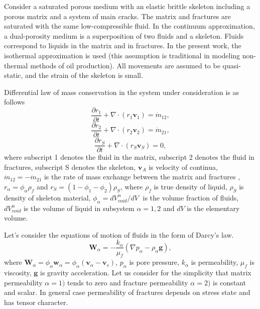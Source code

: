 \documentclass[article,authoryear,jpm]{beg_39}             %
\begin{document}
Consider a saturated porous medium with an elastic brittle skeleton including a porous matrix and a system of main cracks.
The matrix and fractures are saturated with the same low-compressible fluid.
In the continuum approximation, a dual-porosity medium is a superposition of two fluids and a skeleton.
Fluids correspond to liquids in the matrix and in fractures.
In the present work, the isothermal approximation is used (this assumption is traditional in modeling non-thermal methods of oil production).
All movements are assumed to be quasi-static, and the strain of the skeleton is small.

Differential law of mass conservation in the system under consideration is as follows
\begin{equation}
\frac{\partial {{r}_{1}}}{\partial t}+\nabla \cdot \left( {{r}_{1}}{{\mathbf{v}}_{1}} \right)={{\dot{m}}_{12}},
\end{equation}
\begin{equation}
\frac{\partial {{r}_{2}}}{\partial t}+\nabla \cdot \left( {{r}_{2}}{{\mathbf{v}}_{2}} \right)={{\dot{m}}_{21}},
\end{equation}
\begin{equation}
\frac{\partial {{r}_{S}}}{\partial t}+\nabla \cdot \left( {{r}_{S}}{{\mathbf{v}}_{S}} \right)=0,
\end{equation}
where subscript 1 denotes the fluid in the matrix, subscript 2 denotes the fluid in fractures, subscript S denotes the skeleton, ${{\mathbf{v}}_{A}}$ is velocity of continua, ${{\dot{m}}_{12}}=-{{\dot{m}}_{21}}$ is the rate of mass exchange between the matrix and fractures , ${{r}_{\alpha }}={{\phi }_{\alpha }}{{\rho }_{f}}$ and ${{r}_{S}}=(1-{{\phi }_{1}}-{{\phi }_{2}}){{\rho }_{S}}$, where ${{\rho }_{f}}$ is true density of liquid, ${{\rho }_{S}}$ is density of skeleton material, ${{\phi }_{\alpha }}={dV_{void}^{\alpha }}/{dV}\;$ is the volume fraction of fluids, $dV_{void}^{\alpha }$ is the volume of liquid in subsystem $\alpha=1,2$ and $dV$ is the elementary volume.

Let’s consider the equations of motion of fluids in the form of Darcy’s law.
\begin{equation}
{{\mathbf{W}}_{\alpha }}=-\frac{{{k}_{\alpha }}}{{{\mu }_{f}}}\left( \nabla {{p}_{\alpha }}-{{\rho }_{\alpha }}\mathbf{g} \right),
\end{equation}
where ${{\mathbf{W}}_{\alpha }}={{\phi }_{\alpha }}{{\mathbf{w}}_{\alpha }}={{\phi }_{\alpha }}\left( {{\mathbf{v}}_{\alpha }}-{{\mathbf{v}}_{s}} \right)$, ${{p}_{\alpha }}$ is pore pressure, ${{k}_{\alpha }}$ is permeability, ${{\mu }_{f}}$ is viscosity, $\mathbf{g}$ is gravity acceleration. Let us consider for the simplicity that matrix permeability ${\alpha}=1)$ tends to zero and fracture permeability ${\alpha}=2)$ is constant and scalar.
In general case permeability of fractures depends on stress state and has tensor character.
\end{document}
